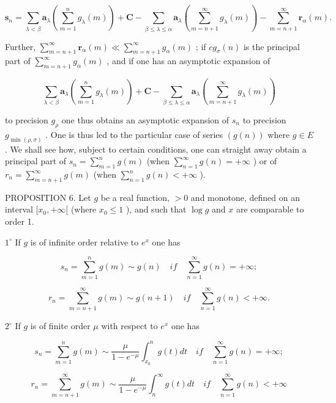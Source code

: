 \[
\mathbf {s} _ {n} = \sum_ {\lambda <   \beta} \mathbf {a} _ {\lambda} \left(\sum_ {m = 1} ^ {n} g _ {\lambda} (m)\right) + \mathbf {C} - \sum_ {\beta \leqslant \lambda \leqslant \alpha} \mathbf {a} _ {\lambda} \left(\sum_ {m = n + 1} ^ {\infty} g _ {\lambda} (m)\right) - \sum_ {m = n + 1} ^ {\infty} \mathbf {r} _ {\alpha} (m).
\]

Further, \(\sum_{m=n+1}^{\infty}\mathbf{r}_{\alpha}(m)\ll\sum_{m=n+1}^{\infty}g_{\alpha}(m)\) ; if \(cg_{\sigma}(n)\) is the principal part of \(\sum_{m=n+1}^{\infty}g_{\alpha}(m)\) , and if one has an asymptotic expansion of

\[
\sum_ {\lambda <   \beta} \mathbf {a} _ {\lambda} \left(\sum_ {m = 1} ^ {n} g _ {\lambda} (m)\right) + \mathbf {C} - \sum_ {\beta \leqslant \lambda \leqslant \alpha} \mathbf {a} _ {\lambda} \left(\sum_ {m = n + 1} ^ {\infty} g _ {\lambda} (m)\right)
\]

to precision \(g_{\rho}\) one thus obtains an asymptotic expansion of \(s_{n}\) to precision \(g_{\min(\rho,\sigma)}\) . One is thus led to the particular case of series \((g(n))\) where \(g \in E\) . We shall see how, subject to certain conditions, one can straight away obtain a principal part of \(s_{n} = \sum_{m=1}^{n} g(m)\) (when \(\sum_{n=1}^{\infty} g(n) = +\infty\) ) or of \(r_{n} = \sum_{m=n+1}^{\infty} g(m)\) (when \(\sum_{n=1}^{n} g(n) < +\infty\) ).

PROPOSITION 6. Let \(g\) be a real function, \(>0\) and monotone, defined on an interval \([x_0, +\infty[\) (where \(x_0 \leqslant 1\) ), and such that \(\log g\) and \(x\) are comparable to order 1.

\(1^{\circ}\) If \(g\) is of infinite order relative to \(e^{x}\) one has

\[
s _ {n} = \sum_ {m = 1} ^ {n} g (m) \sim g (n) \quad i f \quad \sum_ {n = 1} ^ {\infty} g (n) = + \infty ;\tag{1}
\]

\[
r _ {n} = \sum_ {m = n + 1} ^ {\infty} g (m) \sim g (n + 1) \quad i f \quad \sum_ {n = 1} ^ {\infty} g (n) <   + \infty .\tag{2}
\]

\(2^{\circ}\) If \(g\) is of finite order \(\mu\) with respect to \(e^{x}\) one has

\[
s _ {n} = \sum_ {m = 1} ^ {n} g (m) \sim \frac {\mu}{1 - e ^ {- \mu}} \int_ {x _ {0}} ^ {n} g (t) d t \quad i f \quad \sum_ {n = 1} ^ {\infty} g (n) = + \infty ;\tag{3}
\]

\[
r _ {n} = \sum_ {m = n + 1} ^ {\infty} g (m) \sim \frac {\mu}{1 - e ^ {- \mu}} \int_ {n} ^ {\infty} g (t) d t \quad i f \quad \sum_ {n = 1} ^ {\infty} g (n) <   + \infty\tag{4}
\]

